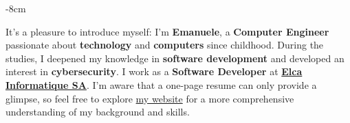 \documentclass[10pt,a4paper]{altacv}
\begin{document}







\begin{adjustwidth}{}{-8cm}
\makecvheader
\end{adjustwidth}

It's a pleasure to introduce myself: I'm \textbf{Emanuele}, a \textbf{Computer Engineer} passionate about \textbf{technology} and \textbf{computers} since childhood. During the studies, I deepened my knowledge in \textbf{software development} and developed an interest in \textbf{cybersecurity}. I work as a \textbf{Software Developer} at \href{https://www.elca.ch/}{\textbf{Elca Informatique SA}}. I'm aware that a one-page resume can only provide a glimpse, so feel free to explore \href{https://emanueleseminara.it/}{ my website} for a more comprehensive understanding of my background and skills.

\end{document}
